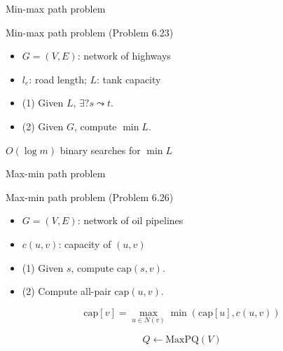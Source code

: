 \begin{frame}{Min-max path problem}
  \begin{exampleblock}{Min-max path problem (Problem 6.23)}
	\begin{itemize}
	  \item $G = (V, E)$: network of highways
	  \item $l_e$: road length; $L$: tank capacity
	  \item (1) Given $L$, $\exists? s \leadsto t$.
	  \item (2) Given $G$, compute $\min L$.
	\end{itemize}
  \end{exampleblock}

  \vspace{0.50cm}
  \centerline{$O(\log m)$ binary searches for $\min L$}
\end{frame}
\begin{frame}{Max-min path problem}
  \begin{exampleblock}{Max-min path problem (Problem 6.26)}
	\begin{itemize}
	  \item $G = (V, E)$: network of oil pipelines
	  \item $c(u,v)$: capacity of $(u,v)$
	  \item (1) Given $s$, compute $\text{cap}(s, v)$.
	  \item (2) Compute all-pair $\text{cap}(u,v)$.
	\end{itemize}
  \end{exampleblock}

  \[
	\text{cap}[v] = \max_{u \in N(v)} \min (\text{cap}[u], c(u,v))
  \]

  \[
	Q \gets \text{MaxPQ}(V)
  \]
\end{frame}
